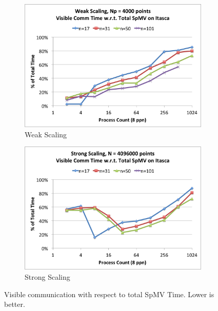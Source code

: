 \documentclass{report}
\begin{document}
\begin{figure}
\centering
\begin{subfigure}{0.48\textwidth}
\centering
\includegraphics[width=\textwidth]{performance_content/scaling/weak_scaling_comm_only_np4000_overlap_cpu_SpMV_and_comm_all_stencils.png}
\caption{Weak Scaling}
\label{fig:compare_weak_scaling_unoverlapped_comm_all_stencils}
\end{subfigure}
\begin{subfigure}{0.48\textwidth}
\centering
\includegraphics[width=\textwidth]{performance_content/scaling/strong_scaling_comm_only_4M_overlap_cpu_SpMV_and_comm_all_stencils.png}
\caption{Strong Scaling}
\label{fig:compare_strong_scaling_unoverlap_comm_all_stencils}
\end{subfigure}
\caption{Visible communication with respect to total SpMV Time. Lower is better.}
\label{fig:visible_comm}
\end{figure}
\end{document}
